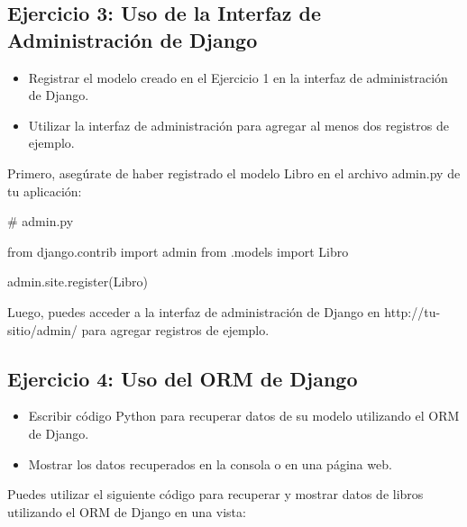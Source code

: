 \documentclass[
  a4paper,
  DIV=11,
  numbers=noendperiod,
  onepage,
  openany]{scrreprt}
\newenvironment{Shaded}{\begin{snugshade}}{\end{snugshade}}
\newcommand{\CommentTok}[1]{\textcolor[rgb]{0.37,0.37,0.37}{#1}}
\newcommand{\ImportTok}[1]{\textcolor[rgb]{0.00,0.46,0.62}{#1}}
\newcommand{\NormalTok}[1]{\textcolor[rgb]{0.00,0.23,0.31}{#1}}
\providecommand{\tightlist}{%
  \setlength{\itemsep}{0pt}\setlength{\parskip}{0pt}}\usepackage{longtable,booktabs,array}
\begin{document}
\subsection{\texorpdfstring{\textbf{Ejercicio 3:} Uso de la Interfaz de
Administración de
Django}{Ejercicio 3: Uso de la Interfaz de Administración de Django}}\label{ejercicio-3-uso-de-la-interfaz-de-administraciuxf3n-de-django}

\begin{itemize}
\tightlist
\item
  Registrar el modelo creado en el Ejercicio 1 en la interfaz de
  administración de Django.
\item
  Utilizar la interfaz de administración para agregar al menos dos
  registros de ejemplo.
\end{itemize}

Primero, asegúrate de haber registrado el modelo Libro en el archivo
admin.py de tu aplicación:

\begin{Shaded}
\begin{Highlighting}[]
\CommentTok{\# admin.py}

\ImportTok{from}\NormalTok{ django.contrib }\ImportTok{import}\NormalTok{ admin}
\ImportTok{from}\NormalTok{ .models }\ImportTok{import}\NormalTok{ Libro}

\NormalTok{admin.site.register(Libro)}
\end{Highlighting}
\end{Shaded}

Luego, puedes acceder a la interfaz de administración de Django en
http://tu-sitio/admin/ para agregar registros de ejemplo.

\subsection{\texorpdfstring{\textbf{Ejercicio 4:} Uso del ORM de
Django}{Ejercicio 4: Uso del ORM de Django}}\label{ejercicio-4-uso-del-orm-de-django}

\begin{itemize}
\tightlist
\item
  Escribir código Python para recuperar datos de su modelo utilizando el
  ORM de Django.
\item
  Mostrar los datos recuperados en la consola o en una página web.
\end{itemize}

Puedes utilizar el siguiente código para recuperar y mostrar datos de
libros utilizando el ORM de Django en una vista:
\end{document}

